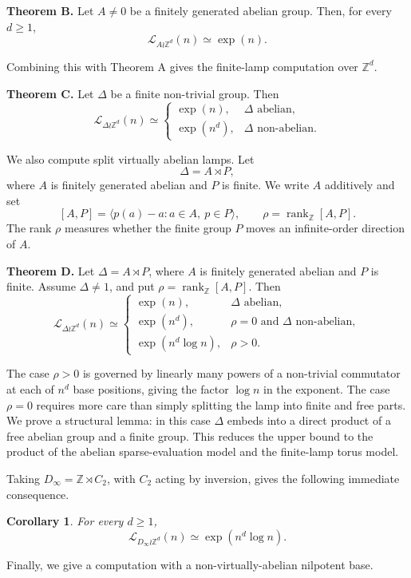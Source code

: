 \documentclass[11pt]{article}
\newcommand{\LEF}{\mathcal L}
\newcommand{\Z}{\mathbb Z}
\newcommand{\rank}{\operatorname{rank}}
\newtheorem{corollary}[theorem]{Corollary}
\begin{document}
\noindent\textbf{Theorem B.}
Let \(A\neq 0\) be a finitely generated abelian group. Then, for every \(d\ge 1\),
\[
\LEF_{A\wr\Z^d}(n)\simeq \exp(n).
\]

Combining this with Theorem A gives the finite-lamp computation over \(\Z^d\).

\noindent\textbf{Theorem C.}
Let \(\Delta\) be a finite non-trivial group. Then
\[
\LEF_{\Delta\wr\Z^d}(n)\simeq
\begin{cases}
\exp(n), & \Delta\text{ abelian},\\
\exp(n^d), & \Delta\text{ non-abelian}.
\end{cases}
\]

We also compute split virtually abelian lamps. Let
\[
\Delta=A\rtimes P,
\]
where \(A\) is finitely generated abelian and \(P\) is finite. We write \(A\) additively and set
\[
[A,P]=\langle p(a)-a:a\in A,\ p\in P\rangle,\qquad \rho=\rank_\Z[A,P].
\]
The rank \(\rho\) measures whether the finite group \(P\) moves an infinite-order direction of \(A\).

\noindent\textbf{Theorem D.}
Let \(\Delta=A\rtimes P\), where \(A\) is finitely generated abelian and \(P\) is finite. Assume \(\Delta\neq 1\), and put \(\rho=\rank_\Z[A,P]\). Then
\[
\LEF_{\Delta\wr\Z^d}(n)\simeq
\begin{cases}
\exp(n), & \Delta\text{ abelian},\\
\exp(n^d), & \rho=0\text{ and }\Delta\text{ non-abelian},\\
\exp(n^d\log n), & \rho>0.
\end{cases}
\]

The case \(\rho>0\) is governed by linearly many powers of a non-trivial commutator at each of \(n^d\) base positions, giving the factor \(\log n\) in the exponent. The case \(\rho=0\) requires more care than simply splitting the lamp into finite and free parts. We prove a structural lemma: in this case \(\Delta\) embeds into a direct product of a free abelian group and a finite group. This reduces the upper bound to the product of the abelian sparse-evaluation model and the finite-lamp torus model.

Taking \(D_\infty=\Z\rtimes C_2\), with \(C_2\) acting by inversion, gives the following immediate consequence.

\begin{corollary}
For every \(d\ge 1\),
\[
\LEF_{D_\infty\wr\Z^d}(n)\simeq \exp(n^d\log n).
\]
\end{corollary}

Finally, we give a computation with a non-virtually-abelian nilpotent base.
\end{document}
